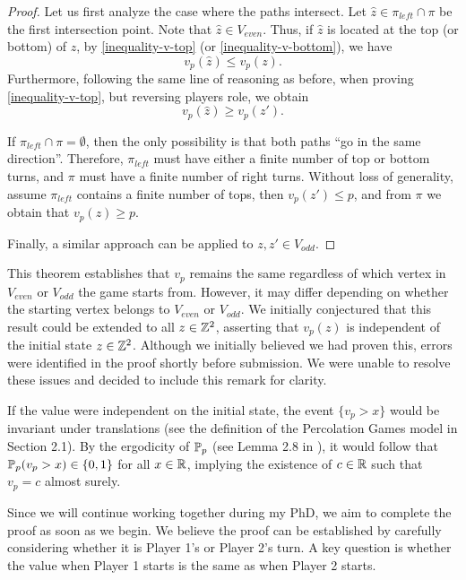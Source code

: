 \begin{proof}
    Let us first analyze the case where the paths intersect. Let $\hat{z} \in \pi_{left} \cap \pi$ be the first intersection point. Note that $\hat{z} \in V_{even}$. Thus, if $\hat{z}$ is located at the top (or bottom) of $z$, by \eqref{inequality-v-top} (or \eqref{inequality-v-bottom}), we have
    \begin{equation*}
        v_p(\hat{z}) \leq v_p(z).
    \end{equation*}
    Furthermore, following the same line of reasoning as before, when proving \eqref{inequality-v-top}, but reversing players role, we obtain 
    \begin{equation*}
         v_p(\hat{z}) \geq v_p(z'). 
    \end{equation*}
    
    If $\pi_{left} \cap \pi = \emptyset$, then the only possibility is that both paths ``go in the same direction''. Therefore, $\pi_{left}$ must have either a finite number of top or bottom turns, and $\pi$ must have a finite number of right turns. Without loss of generality, assume $\pi_{left}$ contains a finite number of tops, then $v_p(z') \leq p$, and from $\pi$ we obtain that $v_p(z) \geq p$. 

    Finally, a similar approach can be applied to $z, z' \in V_{odd}$.

\end{proof}

\begin{remark} 
    This theorem establishes that $v_p$ remains the same regardless of which vertex in $V_{even}$ or $V_{odd}$ the game starts from. However, it may differ depending on whether the starting vertex belongs to $V_{even}$ or $V_{odd}$. We initially conjectured that this result could be extended to all $z \in \mathbb{Z}^2$, asserting that $v_p(z)$ is independent of the initial state $z \in \mathbb{Z}^2$. Although we initially believed we had proven this, errors were identified in the proof shortly before submission. We were unable to resolve these issues and decided to include this remark for clarity.
\end{remark}

If the value were independent on the initial state, the event $\{v_p > x\}$ would be invariant under translations (see the definition of the Percolation Games model in Section 2.1). By the ergodicity of $\mathbb{P}_p$ (see Lemma 2.8 in \cite{DuminilCopin2018}), it would follow that $\mathbb{P}_p(v_p > x) \in \{0, 1\}$ for all $x \in \mathbb{R}$, implying the existence of $c \in \mathbb{R}$ such that $v_p =  c$ almost surely.

Since we will continue working together during my PhD, we aim to complete the proof as soon as we begin. We believe the proof can be established by carefully considering whether it is Player 1's or Player 2's turn. A key question is whether the value when Player 1 starts is the same as when Player 2 starts.